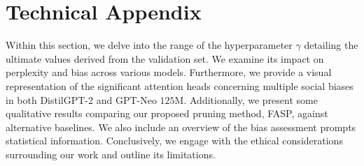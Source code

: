 \documentclass[letterpaper]{article} %
\begin{document}
\clearpage
\appendix
\section{Technical Appendix}
Within this section, we delve into the range of the hyperparameter $\gamma$ detailing the ultimate values derived from the validation set. We examine its impact on perplexity and bias across various models. Furthermore, we provide a visual representation of the significant attention heads concerning multiple social biases in both DistilGPT-2 and GPT-Neo $125$M. Additionally, we present some qualitative results comparing our proposed pruning method, FASP, against alternative baselines. We also include an overview of the bias assessment prompts statistical information. Conclusively, we engage with the ethical considerations surrounding our work and outline its limitations.
\end{document}
